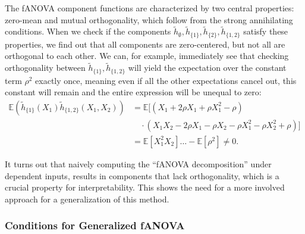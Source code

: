 The fANOVA component functions are characterized by two central properties: zero-mean and mutual orthogonality, which follow from the strong annihilating conditions.
When we check if the components $\tilde{h}_{\emptyset}, \tilde{h}_{\{1\}}, \tilde{h}_{\{2\}}, \tilde{h}_{\{1,2\}}$ satisfy these properties, we find out that all components are zero-centered, but not all are orthogonal to each other. We can, for example, immediately see that checking orthogonality between $\tilde{h}_{\{1\}}, \tilde{h}_{\{1,2\}}$ will yield the expectation over the constant term $\rho^2$ exactly once, meaning even if all the other expectations cancel out, this constant will remain and the entire expression will be unequal to zero:
\begin{align*}
    \mathbb{E}(\tilde{h}_{\{1\}}(X_1)\tilde{h}_{\{1,2\}}(X_1, X_2)) 
    &= \mathbb{E}[(X_1 + 2\rho X_1 + \rho X_1^2 - \rho) \\
    &\quad \cdot (X_1 X_2 - 2\rho X_1 - \rho X_2 - \rho X_1^2 - \rho X_2^2 + \rho)] \\
    &= \mathbb{E}[X_{1}^2X_2] \ldots - \mathbb{E}[\rho^2] \neq 0.
\end{align*}

It turns out that naively computing the ``fANOVA decomposition'' under dependent inputs, results in components that lack orthogonality, which is a crucial property for interpretability.
This shows the need for a more involved approach for a generalization of this method.

\subsubsection{Conditions for Generalized fANOVA}

